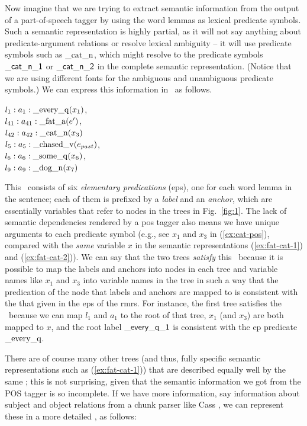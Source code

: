 Now imagine that we are trying to extract semantic information from
the output of a part-of-speech tagger by using the word lemmas as
lexical predicate symbols.  Such a semantic representation is highly
partial, as it will not say anything about predicate-argument
relations or resolve lexical ambiguity -- it will use predicate
symbols such as $\mathrm{\_cat\_n}$, which might resolve to the
predicate symbols $\mathsf{\_cat\_n\_1}$ or $\mathsf{\_cat\_n\_2}$ in the
complete semantic representation.  (Notice that we are using different
fonts for the ambiguous and unambiguous predicate symbols.)  
We can
express this information in \rmrs\ as follows.

\begin{examples}
\item \label{ex:cat-pos}
$l_1:a_1:\mathrm{\_every\_q}(x_1)$, \\
$l_{41}:a_{41}:\mathrm{\_fat\_a}(e')$,\\
$l_{42}:a_{42}:\mathrm{\_cat\_n}(x_3)$\\
$l_5:a_5:\mathrm{\_chased\_v}(e_{past})$, \\
$l_6:a_6:\mathrm{\_some\_q}(x_6)$, \\
$l_9:a_9:\mathrm{\_dog\_n}(x_7)$
\end{examples}

This \rmrs\ consists of six \emph{elementary predications} ({\sc ep}s), one
for each word lemma in the sentence; each of them is prefixed by a
\emph{label} and an \emph{anchor}, which are essentially variables
that refer to nodes in the trees in Fig.~\ref{fig:1}.  
The lack of semantic dependencies rendered by a {\sc pos} tagger
also means we have unique arguments to each
predicate symbol (e.g., see $x_1$ and $x_3$ in (\ref{ex:cat-pos}),
compared with the {\em same} variable $x$ in the semantic
representations (\ref{ex:fat-cat-1}) and (\ref{ex:fat-cat-2})).
We can say that
the two trees \emph{satisfy} this \rmrs\ because it is possible to map
the labels and anchors into nodes in each tree and variable names like
$x_1$ and $x_3$ into variable names in the tree in such a way that the
predication
of
the node that labels and anchors are mapped to is consistent with the
that given in the {\sc ep}s of the {\sc rmrs}.
For instance, the first tree satisfies
the \rmrs\ because we can map $l_1$ and $a_1$ to the root of that
tree, $x_1$ (and $x_3$) are both mapped to $x$, and the root label
$\mathsf{\_every\_q\_1}$ is consistent with the 
{\sc ep} predicate $\mathrm{\_every\_q}$.

There are of course many other trees (and thus, fully specific
semantic representations such as (\ref{ex:fat-cat-1})) that are
described equally well by the same \rmrs; this is not surprising,
given that the semantic information we got from the POS tagger is so
incomplete.  If we have more information, say information about
subject and object relations from a chunk parser like Cass
\cite{abney:1996}, we can represent these in a more
detailed \rmrs, as follows:

